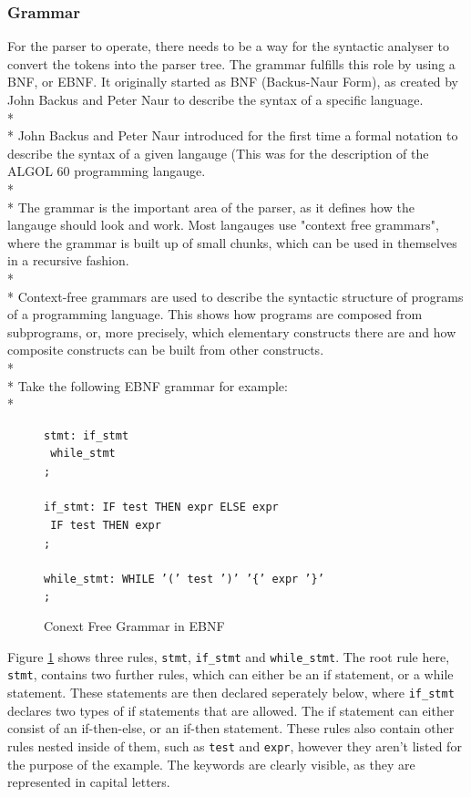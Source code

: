 \documentclass[12pt]{report}
\begin{document}
\subsubsection{Grammar}\label{subsubsec:grammar}
For the parser to operate, there needs to be a way for the syntactic analyser to convert the tokens into the parser tree.  The grammar fulfills this role by using a BNF, or EBNF.  It originally started as BNF (Backus-Naur Form), as created by John Backus and Peter Naur to describe the syntax of a specific language.\\*
\\*
John Backus and Peter Naur introduced for the first time a formal notation to describe the syntax of a given langauge (This was for the description of the ALGOL 60 programming langauge. \citep{whatisbnfnotation}
\\*
\\*
The grammar is the important area of the parser, as it defines how the langauge should look and work.  Most langauges use "context free grammars", where the grammar is built up of small chunks, which can be used in themselves in a recursive fashion.\\*
\\*
Context-free grammars are used to describe the syntactic structure of programs of a programming language.  This shows how programs are composed from subprograms, or, more precisely, which elementary constructs there are and how composite constructs can be built from other constructs. \citep{compilerdesign95}\\*
\\*
Take the following EBNF grammar for example:\\*
\begin{figure}[H]
\begin{tabbing}
\texttt{stmt:}\= \texttt{ if\_stmt}\\
\>\textbar \texttt { while\_stmt}\\
\>\texttt{;}\\
\\
\texttt{if\_stmt:}\= \texttt{ IF test THEN expr ELSE expr}\\
\>\textbar \texttt{ IF test THEN expr}\\
\>\texttt{;}\\
\\
\texttt{while\_stmt:}\= \texttt{ WHILE '(' test ')' '\{' expr '\}'}\\
\>\texttt{;}\\
\end{tabbing}
\caption{Conext Free Grammar in EBNF}\label{fig:context_free}
\end{figure}
Figure \ref{fig:context_free} shows three rules, \texttt{stmt}, \texttt{if\_stmt} and \texttt{while\_stmt}.  The root rule here, \texttt{stmt}, contains two further rules, which can either be an if statement, or a while statement.  These statements are then declared seperately below, where \texttt{if\_stmt} declares two types of if statements that are allowed.  The if statement can either consist of an if-then-else, or an if-then statement.  These rules also contain other rules nested inside of them, such as \texttt{test} and \texttt{expr}, however they aren't listed for the purpose of the example.  The keywords are clearly visible, as they are represented in capital letters.
\end{document}

